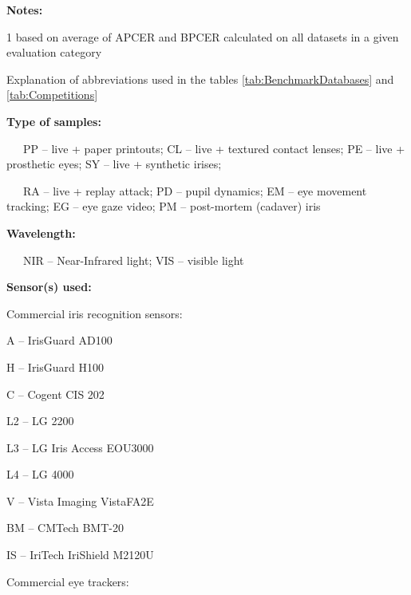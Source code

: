 \documentclass[format=acmsmall, review=false, timestamp=false]{acmart}
\begin{document}
\begin{landscape}
\begin{table}[htb!]
\begin{center}
\begin{threeparttable}
\begin{tabular}{llllllllll}
	    \hline
        \end{tabular}
        \begin{tablenotes}
        \tiny
        \item
        \item {\bf Notes:}
        \item[1] based on {average of APCER and BPCER} calculated on all datasets in a given evaluation category
		\item
		\item
		\item
		\item
		\hrulefill
		\label{tabs:explanation}
		\item {\normalsize Explanation of abbreviations used in the tables \ref{tab:BenchmarkDatabases} and \ref{tab:Competitions}}
		\item
		\item {\bf Type of samples:} 
		\item ~~~PP -- live + paper printouts; CL -- live + textured contact lenses; PE -- live + prosthetic eyes; SY -- live + synthetic irises; 
		\item ~~~RA -- live + replay attack; PD -- pupil dynamics; EM -- eye movement tracking; EG -- eye gaze video; PM -- post-mortem (cadaver) iris
		\item
      		\item {\bf Wavelength:} 
      		\item ~~~NIR -- Near-Infrared light; VIS -- visible light
		\item
		\item {\bf Sensor(s) used:}
		\item\noindent%
		\begin{minipage}{0.65\textwidth}
		\item Commercial iris recognition sensors:
		\item A -- IrisGuard AD100
		\item H -- IrisGuard H100
		\item C -- Cogent CIS 202
		\item L2 -- LG 2200
		\item L3 -- LG Iris Access EOU3000		
		\item L4 -- LG 4000
		\item V -- Vista Imaging VistaFA2E
		\item BM -- CMTech BMT-20
		\item IS -- IriTech IriShield M2120U
		\item 
		\item Commercial eye trackers:

\end{minipage}
\end{tablenotes}
\end{threeparttable}
\end{center}
\end{table}
\end{landscape}
\end{document}
